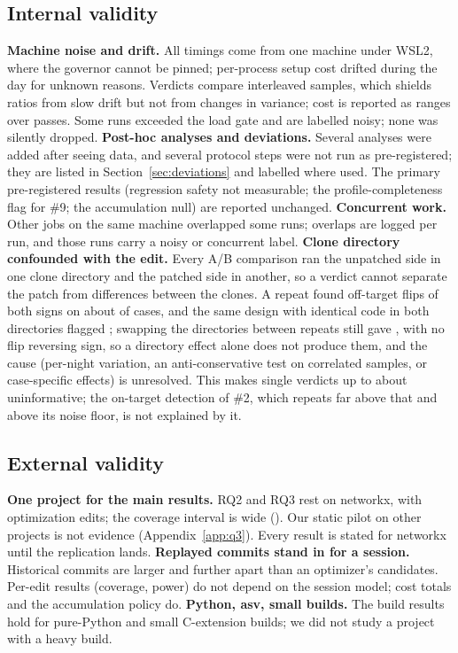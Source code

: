 \subsection{Internal validity}
\textbf{Machine noise and drift.} All timings come from one machine under WSL2, where the governor cannot be pinned; per-process setup cost drifted during the day for unknown reasons. Verdicts compare interleaved samples, which shields ratios from slow drift but not from changes in variance; cost is reported as ranges over passes. Some runs exceeded the load gate and are labelled noisy; none was silently dropped. 
\textbf{Post-hoc analyses and deviations.} Several analyses were added after seeing data, and several protocol steps were not run as pre-registered; they are listed in Section~\ref{sec:deviations} and labelled where used. The primary pre-registered results (regression safety not measurable; the profile-completeness flag for \#9; the accumulation null) are reported unchanged.
\textbf{Concurrent work.} Other jobs on the same machine overlapped some runs; overlaps are logged per run, and those runs carry a noisy or concurrent label.
\textbf{Clone directory confounded with the edit.} Every A/B comparison ran the unpatched side in one clone directory and the patched side in another, so a verdict cannot separate the patch from differences between the clones. A repeat found off-target flips of both signs on about \TwoFlipPct\pct{} of cases, and the same design with identical code in both directories flagged \DirAAPct\pct; swapping the directories between repeats still gave \SwapPct\pct, with no flip reversing sign, so a directory effect alone does not produce them, and the cause (per-night variation, an anti-conservative test on correlated samples, or case-specific effects) is unresolved. This makes single verdicts up to about \DirAAMaxDev\x{} uninformative; the on-target detection of \#2, which repeats far above that and above its noise floor, is not explained by it.

\subsection{External validity}
\textbf{One project for the main results.} RQ2 and RQ3 rest on networkx, with \NxAgentOpt{} optimization edits; the coverage interval is wide (\ci{\BOneAgentLo}{\BOneAgentHi}). Our static pilot on other projects is not evidence (Appendix~\ref{app:q3}). Every result is stated for networkx until the replication lands. 
\textbf{Replayed commits stand in for a session.} Historical commits are larger and further apart than an optimizer's candidates. Per-edit results (coverage, power) do not depend on the session model; cost totals and the accumulation policy do.
\textbf{Python, asv, small builds.} The build results hold for pure-Python and small C-extension builds; we did not study a project with a heavy build.

